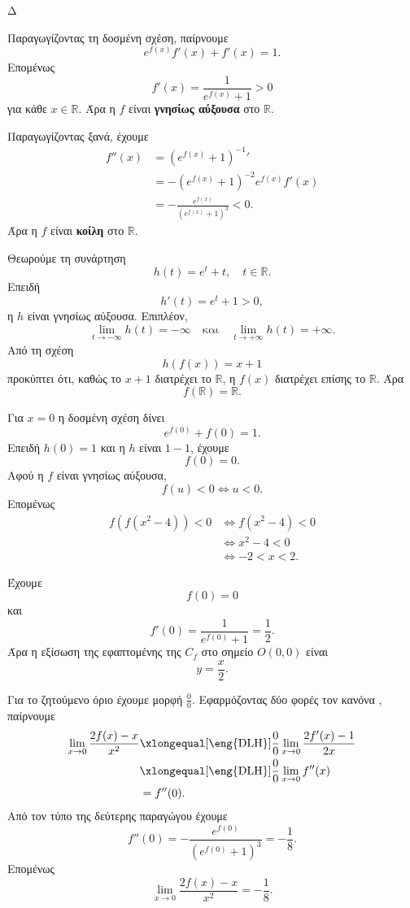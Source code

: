 \begin{thema}{Δ}
\begin{erwthma}
\item Παραγωγίζοντας τη δοσμένη σχέση, παίρνουμε
\[
e^{f(x)}f'(x)+f'(x)=1.
\]
Επομένως
\[
f'(x)=\frac{1}{e^{f(x)}+1}>0
\]
για κάθε $x\in\mathbb{R}$. Άρα η $f$ είναι \textbf{γνησίως αύξουσα} στο $\mathbb{R}$.

Παραγωγίζοντας ξανά, έχουμε
\begin{align*}
f''(x)
&=\left(e^{f(x)}+1\right)^{-1}'\\
&=-\left(e^{f(x)}+1\right)^{-2}
e^{f(x)}f'(x)\\
&=-\frac{e^{f(x)}}{\left(e^{f(x)}+1\right)^3}<0.
\end{align*}
Άρα η $f$ είναι \textbf{κοίλη} στο $\mathbb{R}$.

\item Θεωρούμε τη συνάρτηση
\[
h(t)=e^t+t,\quad t\in\mathbb{R}.
\]
Επειδή
\[
h'(t)=e^t+1>0,
\]
η $h$ είναι γνησίως αύξουσα. Επιπλέον,
\[
\lim_{t\to-\infty}h(t)=-\infty
\quad\text{και}\quad
\lim_{t\to+\infty}h(t)=+\infty.
\]
Από τη σχέση
\[
h(f(x))=x+1
\]
προκύπτει ότι, καθώς το $x+1$ διατρέχει το $\mathbb{R}$, η $f(x)$ διατρέχει επίσης το $\mathbb{R}$. Άρα
\[
{f(\mathbb{R})=\mathbb{R}}.
\]

Για $x=0$ η δοσμένη σχέση δίνει
\[
e^{f(0)}+f(0)=1.
\]
Επειδή $h(0)=1$ και η $h$ είναι $1-1$, έχουμε
\[
{f(0)=0}.
\]
Αφού η $f$ είναι γνησίως αύξουσα,
\[
f(u)<0\Leftrightarrow u<0.
\]
Επομένως
\begin{align*}
f\left(f(x^2-4)\right)<0
&\Leftrightarrow f(x^2-4)<0\\
&\Leftrightarrow x^2-4<0\\
&\Leftrightarrow {-2<x<2}.
\end{align*}

\item Έχουμε
\[
f(0)=0
\]
και
\[
f'(0)=\frac{1}{e^{f(0)}+1}=\frac{1}{2}.
\]
Άρα η εξίσωση της εφαπτομένης της $C_f$ στο σημείο $O(0,0)$ είναι
\[
{y=\frac{x}{2}}.
\]

Για το ζητούμενο όριο έχουμε μορφή $\frac{0}{0}$. Εφαρμόζοντας δύο φορές τον κανόνα , παίρνουμε
\begin{align*}
\lim_{x\to0}\frac{2f(x)-x}{x^2}
&\xlongequal[\text{\eng{DLH}}]{\frac{0}{0}}
\lim_{x\to0}\frac{2f'(x)-1}{2x}\\
&\xlongequal[\text{\eng{DLH}}]{\frac{0}{0}}
\lim_{x\to0}f''(x)\\
&=f''(0).
\end{align*}
Από τον τύπο της δεύτερης παραγώγου έχουμε
\[
f''(0)
=-\frac{e^{f(0)}}{\left(e^{f(0)}+1\right)^3}
=-\frac{1}{8}.
\]
Επομένως
\[
{\lim_{x\to0}\frac{2f(x)-x}{x^2}=-\frac{1}{8}}.
\]


\end{erwthma}
\end{thema}
